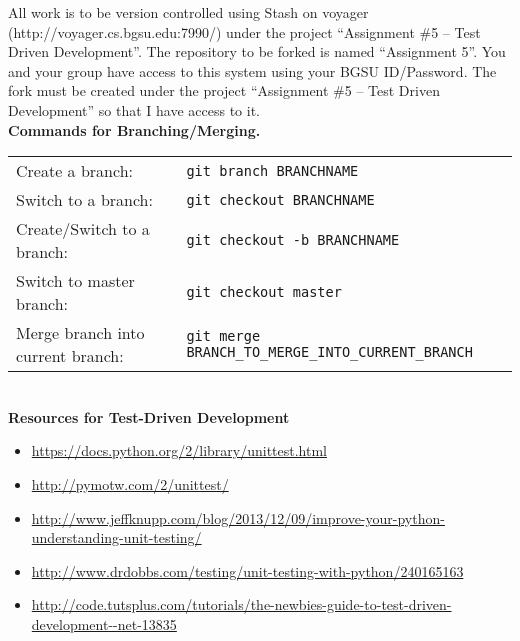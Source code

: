 \documentclass[paper=letter, fontsize=11pt]{scrartcl} %
\begin{document}

    All work is to be version controlled using Stash on voyager (http://voyager.cs.bgsu.edu:7990/) under the project ``Assignment \#5 -- Test Driven Development''. The repository to be forked is named ``Assignment 5''. You and your group have access to this system using your BGSU ID/Password. The fork must be created under the project ``Assignment \#5 -- Test Driven Development'' so that I have access to it. \\

    

    \newpage
    \textbf{Commands for Branching/Merging.}\\ 

    \begin{tabular}{ l l }
        Create a branch:                    & \texttt{git branch BRANCHNAME}        \\
        Switch to a branch:                 & \texttt{git checkout BRANCHNAME}      \\
        Create/Switch to a branch:          & \texttt{git checkout -b BRANCHNAME}   \\
        Switch to master branch:            & \texttt{git checkout master}          \\
        Merge branch into current branch:   & \texttt{git merge BRANCH\_TO\_MERGE\_INTO\_CURRENT\_BRANCH}          \\
    \end{tabular} \\


    \textbf{Resources for Test-Driven Development}
    \begin{itemize}[noitemsep]
        \item \url{https://docs.python.org/2/library/unittest.html}
        \item \url{http://pymotw.com/2/unittest/}
        \item \url{http://www.jeffknupp.com/blog/2013/12/09/improve-your-python-understanding-unit-testing/}
        \item \url{http://www.drdobbs.com/testing/unit-testing-with-python/240165163}
        \item \url{http://code.tutsplus.com/tutorials/the-newbies-guide-to-test-driven-development--net-13835}

    \end{itemize}
\end{document}

